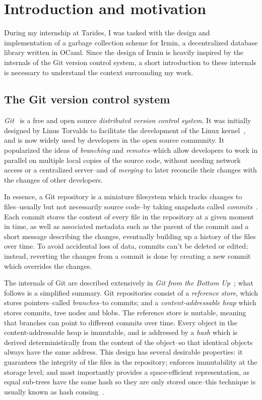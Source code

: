 \section{Introduction and motivation}

During my internship at Tarides, I was tasked with the design and implementation of a garbage collection scheme for Irmin, a decentralized database library written in OCaml. Since the design of Irmin is heavily inspired by the internals of the Git version control system, a short introduction to these internals is necessary to understand the context surrounding my work.

\subsection{The Git version control system}

\emph{Git}~\cite{git} is a free and open source \emph{distributed version control system}. It was initially designed by Linus Torvalds to facilitate the development of the Linux kernel~\cite{git-history}, and is now widely used by developers in the open source community. It popularized the ideas of \emph{branching} and \emph{remotes}--which allow developers to work in parallel on multiple local copies of the source code, without needing network access or a centralized server--and of \emph{merging}--to later reconcile their changes with the changes of other developers.

In essence, a Git repository is a miniature filesystem which tracks changes to files--usually but not necessarily source code--by taking snapshots called \emph{commits}~\cite{git-what-is}. Each commit stores the content of every file in the repository at a given moment in time, as well as associated metadata such as the parent of the commit and a short message describing the changes, eventually building up a history of the files over time. To avoid accidental loss of data, commits can't be deleted or edited; instead, reverting the changes from a commit is done by creating a new commit which overrides the changes.

\bigskip
The internals of Git are described extensively in \emph{Git from the Bottom Up}~\cite{git-bottom-up}; what follows is a simplified summary. Git repositories consist of a \emph{reference store}, which stores pointers--called \emph{branches}--to commits; and a \emph{content-addressable heap} which stores commits, tree nodes and blobs. The reference store is mutable, meaning that branches can point to different commits over time. Every object in the content-addressable heap is immutable, and is addressed by a \emph{hash} which is derived deterministically from the content of the object--so that identical objects always have the same address. This design has several desirable properties: it guarantees the integrity of the files in the repository; enforces immutability at the storage level; and most importantly provides a space-efficient representation, as equal sub-trees have the same hash so they are only stored once--this technique is usually known as hash consing~\cite{filli06}.

